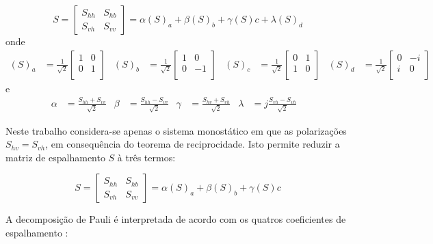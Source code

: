 \documentclass{article}
\begin{document}
\begin{equation}
    S = \begin{bmatrix}
        S_{hh} & S_{hb}\\
	    S_{vh} & S_{vv}
    \end{bmatrix} = \alpha(S)_{a}+\beta(S)_{b}+\gamma(S){c} + \lambda(S)_{d}
\end{equation}
onde
\begin{align}
    (S)_{a} &= \frac{1}{\sqrt{2}} \begin{bmatrix} 1 & 0 \\ 0 & 1\\ \end{bmatrix} &
    (S)_{b} &= \frac{1}{\sqrt{2}} \begin{bmatrix} 1 & 0 \\ 0 & -1\\ \end{bmatrix}&
    (S)_{c} &= \frac{1}{\sqrt{2}} \begin{bmatrix} 0 & 1 \\ 1 & 0\\ \end{bmatrix} &
    (S)_{d} &= \frac{1}{\sqrt{2}} \begin{bmatrix} 0 & -i \\ i & 0\\ \end{bmatrix}& 
\end{align}
e
\begin{align}
    \alpha &= \frac{S_{hh} + S_{vv}}{\sqrt{2}}&
    \beta &= \frac{S_{hh} - S_{vv}}{\sqrt{2}}&
    \gamma &= \frac{S_{hv} + S_{vh}}{\sqrt{2}}&
    \lambda &= j \frac{S_{vh} - S_{vh}}{\sqrt{2}}&
\end{align}

Neste trabalho considera-se apenas o sistema monostático em que as polarizações $S_{hv}=S_{vh}$, em consequência do teorema de reciprocidade. Isto permite reduzir a matriz de espalhamento $S$ à três termos:

\begin{equation}
    S = \begin{bmatrix}
	S_{hh} & S_{hb}\\
	S_{vh} & S_{vv}
	\end{bmatrix} =\alpha(S)_{a}+\beta(S)_{b}+\gamma(S){c} 
\end{equation}

A decomposição de Pauli é interpretada de acordo com os quatros coeficientes de espalhamento \cite{jong:2009}: 
\end{document}
